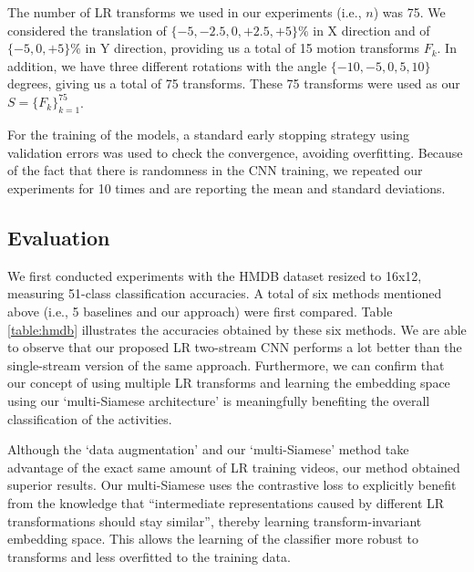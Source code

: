 \documentclass[letterpaper]{article} %
\begin{document}
The number of LR transforms we used in our experiments (i.e., $n$) was 75. We considered the translation of $\{-5, -2.5, 0, +2.5, +5\} \%$ in X direction and of $\{-5, 0, +5\} \%$ in Y direction, providing us a total of 15 motion transforms $F_k$. In addition, we have three different rotations with the angle $\{-10, -5, 0, 5, 10\}$ degrees, giving us a total of 75 transforms. These 75 transforms were used as our $S = \{F_k\}^{75}_{k=1}$.

For the training of the models, a standard early stopping strategy using validation errors was used to check the convergence, avoiding overfitting. Because of the fact that there is randomness in the CNN training, we repeated our experiments for 10 times and are reporting the mean and standard deviations.


\subsection{Evaluation}

We first conducted experiments with the HMDB dataset resized to 16x12, measuring 51-class classification accuracies. A total of six methods mentioned above (i.e., 5 baselines and our approach) were first compared. Table \ref{table:hmdb} illustrates the accuracies obtained by these six methods. We are able to observe that our proposed LR two-stream CNN performs a lot better than the single-stream version of the same approach. Furthermore, we can confirm that our concept of using multiple LR transforms and learning the embedding space using our `multi-Siamese architecture' is meaningfully benefiting the overall classification of the activities.

Although the `data augmentation' and our `multi-Siamese' method take advantage of the exact same amount of LR training videos, our method obtained superior results. Our multi-Siamese uses the contrastive loss to explicitly benefit from the knowledge that ``intermediate representations caused by different LR transformations should stay similar'', thereby learning transform-invariant embedding space. This allows the learning of the classifier more robust to transforms and less overfitted to the training data.
\end{document}

